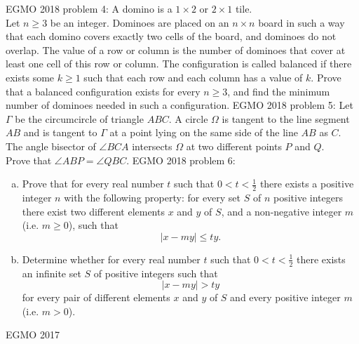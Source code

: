 EGMO 2018 problem 4:  A domino is a $ 1 \times 2 $ or $ 2 \times 1 $ tile. \\
Let $n \ge 3 $ be an integer. Dominoes are placed on an $n \times n$ board in such a way that each domino covers exactly two cells of the board, and dominoes do not overlap. The value of a row or column is the number of dominoes that cover at least one cell of this row or column. The configuration is called balanced if there exists some $k \ge 1 $ such that each row and each column has a value of $k$. Prove that a balanced configuration exists for every $n \ge 3 $, and find the minimum number of dominoes needed in such a configuration. 
EGMO 2018 problem 5:  Let $\Gamma $ be the circumcircle of triangle $ABC$. A circle $\Omega$ is tangent to the line segment $AB$ and is tangent to $\Gamma$ at a point lying on the same side of the line $AB$ as $C$. The angle bisector of $\angle BCA$ intersects $\Omega$ at two different points $P$ and $Q$. \\
Prove that $\angle ABP = \angle QBC$. 
EGMO 2018 problem 6:  \begin{enumerate}[a.]
  \item Prove that for every real number $t$ such that $0 < t < \tfrac{1}{2}$ there exists a positive integer $n$ with the following property: for every set $S$ of $n$ positive integers there exist two different elements $x$ and $y$ of $S$, and a non-negative integer $m$ (i.e. $m \ge 0 $), such that
\[ |x-my|\leq ty. \]
\item Determine whether for every real number $t$ such that $0 < t < \tfrac{1}{2} $ there exists an infinite set $S$ of positive integers such that
\[ |x-my| > ty \]
for every pair of different elements $x$ and $y$ of $S$ and every positive integer $m$ (i.e. $m > 0$).
\end{enumerate} 

EGMO 2017 

